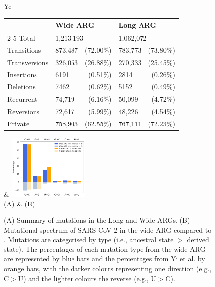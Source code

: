 \documentclass{article}
\begin{document}
\begin{figure} \centering
{}
\begin{tabularx}{\textwidth}{Yc}

\begin{tabular}[b]{llrlr}\toprule
            & \multicolumn{2}{l}{Wide ARG} & \multicolumn{2}{l}{Long ARG} \\
    \cmidrule{2-5}
Total      & \multicolumn{2}{l}{1,213,193} & \multicolumn{2}{l}{1,062,072} \\
Transitions & 873,487   & (72.00\%) & 783,773  & (73.80\%) \\
Transversions & 326,053 & (26.88\%) & 270,333  & (25.45\%) \\
Insertions  & 6191  & (0.51\%) & 2814   & (0.26\%) \\
Deletions   & 7462  & (0.62\%) & 5152   & (0.49\%) \\
Recurrent   & 74,719 & (6.16\%) & 50,099 & (4.72\%) \\
Reversions  & 72,617 & (5.99\%) & 48,226 & (4.54\%) \\
Private     & 758,903 & (62.55\%) &  767,111 & (72.23\%)\\
\bottomrule
\end{tabular}
&
\includegraphics[width=0.35\textwidth]{figures/mutational_spectra.pdf}\\
(A) & (B)\\
\end{tabularx}
\caption{\label{fig:mutational_spectra}
(A) Summary of mutations in the Long and Wide ARGs.
(B) Mutational spectrum of SARS-CoV-2 in
the wide ARG compared to \cite{Yi2021-sc}. Mutations are
categorised by type (i.e., ancestral state $>$ derived state). The percentages
of each mutation type from the wide ARG are represented by blue bars and the
percentages from Yi et al. by orange bars, with the darker colours representing
one direction (e.g., C$>$U) and the lighter colours the reverse (e.g., U$>$C).}
\end{figure}
\end{document}
